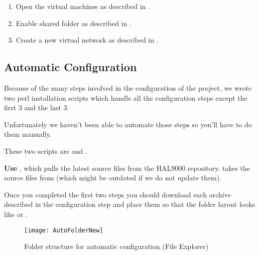 \begin{appendices}
\begin{enumerate}
And the following line after "if \_\%COMPUTERNAME\%\_==\_ALEX-PC\_ goto config\_ALEX-PC" :
\begin{verbatim}
if _%COMPUTERNAME%_==_\var{COMPUTER_NAME}_ goto config_\var{COMPUTER_NAME}
\end{verbatim}

Where the \textbackslash raw variables must be replaced with the proper paths as mentioned in the
configuration steps.

	\item Open the virtual machines as described in .
	 
	\item Enable shared folder as described in .

	\item Create a new virtual network as described in .
\end{enumerate}

\subsection{Automatic Configuration}
\label{sect:AutoConf}

Because of the many steps involved in the configuration of the project, we wrote two perl installation
scripts which handle all the configuration steps except the first 3 and the last 3.

Unfortunately we haven't been able to automate those steps so you'll have to do them manually.

These two scripts are  and .

{\bf Use }, which pulls the latest source files from the HAL9000 repository.
 takes the source files from  (which might be outdated if we do not update them).

Once you completed the first two steps you should download each archive described in the
configuration step and place them so that the folder layout looks like  or .

\begin{figure}
	\centering
	\texttt{[image: AutoFolderNew]}
		\caption{Folder structure for automatic configuration (File Explorer)}
	\label{fig:AutoFolder}
\end{figure}


\end{appendices}
